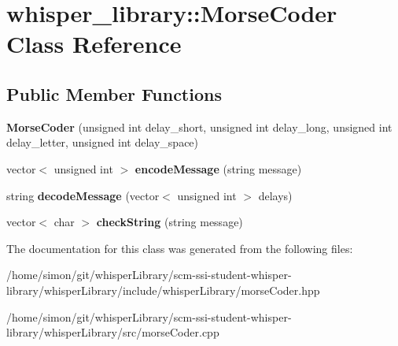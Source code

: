 \hypertarget{classwhisper__library_1_1MorseCoder}{\section{whisper\-\_\-library\-:\-:\-Morse\-Coder \-Class \-Reference}
\label{classwhisper__library_1_1MorseCoder}
}
\subsection*{\-Public \-Member \-Functions}
\begin{DoxyCompactItemize}
\item 
\hypertarget{classwhisper__library_1_1MorseCoder_a283aab21513cc4a91f39d4b842215a78}{{\bfseries \-Morse\-Coder} (unsigned int delay\-\_\-short, unsigned int delay\-\_\-long, unsigned int delay\-\_\-letter, unsigned int delay\-\_\-space)}\label{classwhisper__library_1_1MorseCoder_a283aab21513cc4a91f39d4b842215a78}

\item 
\hypertarget{classwhisper__library_1_1MorseCoder_a33af4ea1bc32b182e90479d47ba509cd}{vector$<$ unsigned int $>$ {\bfseries encode\-Message} (string message)}\label{classwhisper__library_1_1MorseCoder_a33af4ea1bc32b182e90479d47ba509cd}

\item 
\hypertarget{classwhisper__library_1_1MorseCoder_a165512b2705e5b8ac2e0a221d084b8f5}{string {\bfseries decode\-Message} (vector$<$ unsigned int $>$ delays)}\label{classwhisper__library_1_1MorseCoder_a165512b2705e5b8ac2e0a221d084b8f5}

\item 
\hypertarget{classwhisper__library_1_1MorseCoder_a4e9ae270de7f55e37eeecb5180ba1b5d}{vector$<$ char $>$ {\bfseries check\-String} (string message)}\label{classwhisper__library_1_1MorseCoder_a4e9ae270de7f55e37eeecb5180ba1b5d}

\end{DoxyCompactItemize}


\-The documentation for this class was generated from the following files\-:\begin{DoxyCompactItemize}
\item 
/home/simon/git/whisper\-Library/scm-\/ssi-\/student-\/whisper-\/library/whisper\-Library/include/whisper\-Library/morse\-Coder.\-hpp\item 
/home/simon/git/whisper\-Library/scm-\/ssi-\/student-\/whisper-\/library/whisper\-Library/src/morse\-Coder.\-cpp\end{DoxyCompactItemize}
